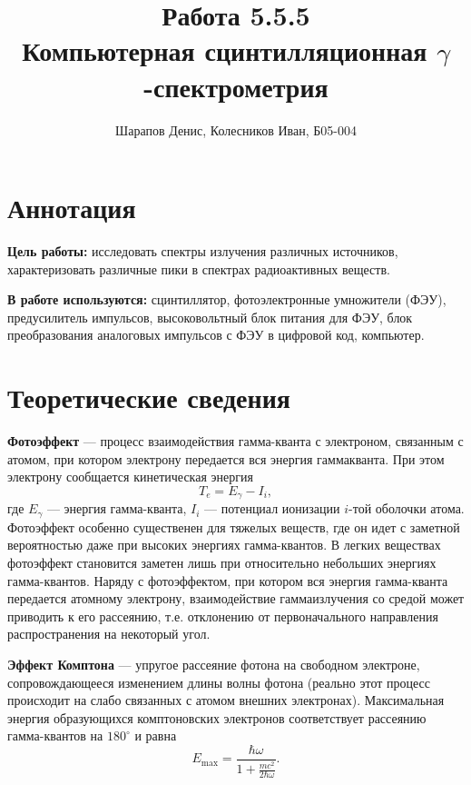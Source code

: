 \documentclass[a4paper]{article}
\title{Работа 5.5.5 \\ Компьютерная сцинтилляционная $\gamma$-спектрометрия}
\author{Шарапов Денис, Колесников Иван, Б05-004}
\date{}
\begin{document}
    \maketitle
    \tableofcontents
    \newpage
    
\section{Аннотация}

\noindent\textbf{Цель работы:} исследовать спектры излучения различных источников, характеризовать различные пики в спектрах радиоактивных веществ. \smallskip
 
\noindent \textbf{В работе используются:} сцинтиллятор, фотоэлектронные умножители (ФЭУ), предусилитель импульсов, высоковольтный блок питания для ФЭУ, блок преобразования аналоговых импульсов с ФЭУ в цифровой код, компьютер.

\section{Теоретические сведения}

\noindent\textbf{Фотоэффект} --- процесс взаимодействия гамма-кванта с электроном, связанным с атомом, при котором электрону передается вся энергия гаммакванта. При этом электрону сообщается кинетическая энергия $$T_e = E_{\gamma} - I_i,$$ где $E_{\gamma}$ --- энергия гамма-кванта, $I_i$ --- потенциал ионизации $i$-той оболочки атома. Фотоэффект особенно существенен для тяжелых веществ, где он идет с заметной вероятностью даже при высоких энергиях гамма-квантов. В легких веществах фотоэффект становится заметен лишь при относительно небольших энергиях гамма-квантов. Наряду с фотоэффектом, при котором вся энергия гамма-кванта передается атомному электрону, взаимодействие гаммаизлучения со средой может приводить к его рассеянию, т.е. отклонению от первоначального направления распространения на некоторый угол. \medskip

\noindent\textbf{Эффект Комптона} --- упругое рассеяние фотона на свободном электроне, сопровождающееся изменением длины волны фотона (реально этот процесс происходит на слабо связанных с атомом внешних электронах). Максимальная энергия образующихся комптоновских электронов соответствует рассеянию гамма-квантов на $180^\circ$ и равна $$E_{\text{max}} = \frac{\hbar\omega }{1 + \frac{mc^2}{2\hbar\omega}}.$$
\end{document}
